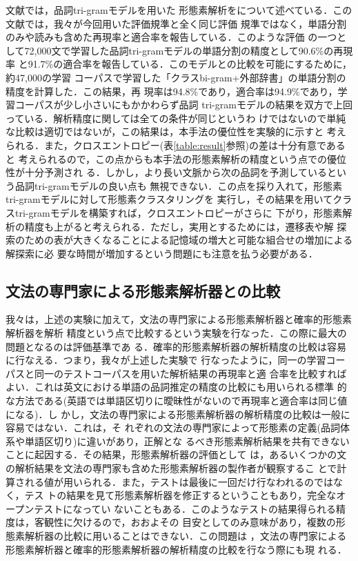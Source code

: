 文献\cite{EDRコーパスを用いた確率的日本語形態素解析}では，品詞tri-gramモデルを用いた
形態素解析をについて述べている．この文献では，我々が今回用いた評価規準と全く同じ評価
規準ではなく，単語分割のみや読みも含めた再現率と適合率を報告している．このような評価
の一つとして72,000文で学習した品詞tri-gramモデルの単語分割の精度として90.6\%の再現率
と91.7\%の適合率を報告している．このモデルとの比較を可能にするために，約47,000の学習
コーパスで学習した「クラスbi-gram+外部辞書」の単語分割の精度を計算した．この結果，再
現率は94.8\%であり，適合率は94.9\%であり，学習コーパスが少し小さいにもかかわらず品詞
tri-gramモデルの結果を双方で上回っている．解析精度に関しては全ての条件が同じというわ
けではないので単純な比較は適切ではないが，この結果は，本手法の優位性を実験的に示すと
考えられる．また，クロスエントロピー(表\ref{table:result}参照)の差は十分有意であると
考えられるので，この点からも本手法の形態素解析の精度という点での優位性が十分予測され
る．しかし，より長い文脈から次の品詞を予測しているという品詞tri-gramモデルの良い点も
無視できない．この点を採り入れて，形態素tri-gramモデルに対して形態素クラスタリングを
実行し，その結果を用いてクラスtri-gramモデルを構築すれば，クロスエントロピーがさらに
下がり，形態素解析の精度も上がると考えられる．ただし，実用とするためには，遷移表や解
探索のための表が大きくなることによる記憶域の増大と可能な組合せの増加による解探索に必
要な時間が増加するという問題にも注意を払う必要がある．





\subsection{文法の専門家による形態素解析器との比較}

我々は，上述の実験に加えて，文法の専門家による形態素解析器と確率的形態素解析器を解析
精度という点で比較するという実験を行なった．この際に最大の問題となるのは評価基準であ
る．確率的形態素解析器の解析精度の比較は容易に行なえる．つまり，我々が上述した実験で
行なったように，同一の学習コーパスと同一のテストコーパスを用いた解析結果の再現率と適
合率を比較すればよい．これは英文における単語の品詞推定の精度の比較にも用いられる標準
的な方法である(英語では単語区切りに曖昧性がないので再現率と適合率は同じ値になる)．し
かし，文法の専門家による形態素解析器の解析精度の比較は一般に容易ではない．これは，そ
れぞれの文法の専門家によって形態素の定義(品詞体系や単語区切り)に違いがあり，正解とな
るべき形態素解析結果を共有できないことに起因する．その結果，形態素解析器の評価として
は，あるいくつかの文の解析結果を文法の専門家も含めた形態素解析器の製作者が観察するこ
とで計算される値が用いられる．また，テストは最後に一回だけ行なわれるのではなく，テス
トの結果を見て形態素解析器を修正するということもあり，完全なオープンテストになってい
ないこともある．このようなテストの結果得られる精度は，客観性に欠けるので，おおよその
目安としてのみ意味があり，複数の形態素解析器の比較に用いることはできない．この問題は
，文法の専門家による形態素解析器と確率的形態素解析器の解析精度の比較を行なう際にも現
れる．

